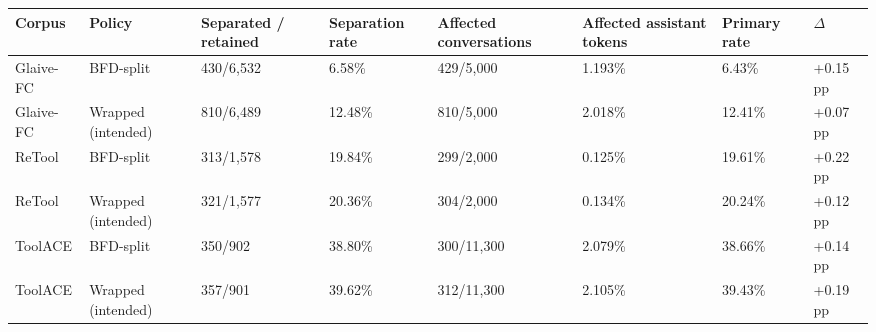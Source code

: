 \begin{tabular}{llllllll}
\toprule
Corpus & Policy & Separated / retained & Separation rate & Affected conversations & Affected assistant tokens & Primary rate & $\Delta$ \\
\midrule
Glaive-FC & BFD-split & 430/6,532 & 6.58\% & 429/5,000 & 1.193\% & 6.43\% & +0.15 pp \\
Glaive-FC & Wrapped (intended) & 810/6,489 & 12.48\% & 810/5,000 & 2.018\% & 12.41\% & +0.07 pp \\
ReTool & BFD-split & 313/1,578 & 19.84\% & 299/2,000 & 0.125\% & 19.61\% & +0.22 pp \\
ReTool & Wrapped (intended) & 321/1,577 & 20.36\% & 304/2,000 & 0.134\% & 20.24\% & +0.12 pp \\
ToolACE & BFD-split & 350/902 & 38.80\% & 300/11,300 & 2.079\% & 38.66\% & +0.14 pp \\
ToolACE & Wrapped (intended) & 357/901 & 39.62\% & 312/11,300 & 2.105\% & 39.43\% & +0.19 pp \\
\bottomrule
\end{tabular}